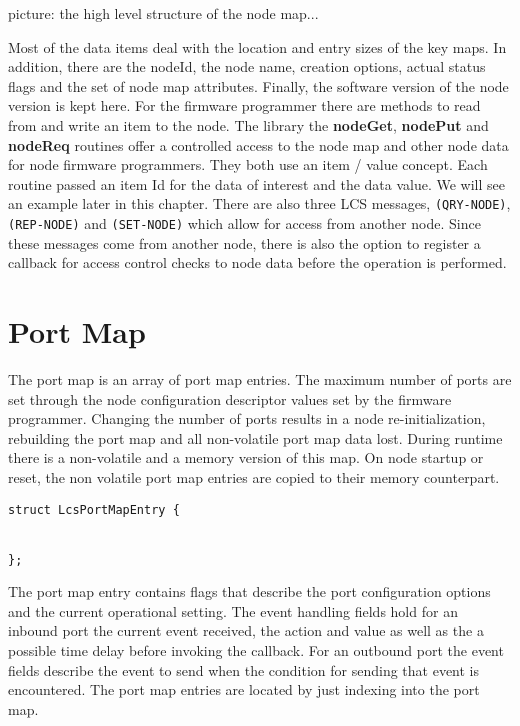 picture: the high level structure of the node map...

\begin{figure}[h]
    \centering
\end{figure}

Most of the data items deal with the location and entry sizes of the key maps. In addition, there are the nodeId, the node name, creation options, actual status flags and the set of node map attributes. Finally, the software version of the node version is kept here. For the firmware programmer there are methods to read from and write an item to the node. The library the \textbf{nodeGet}, \textbf{nodePut} and \textbf{nodeReq} routines offer a controlled access to the node map and other node data for node firmware programmers. They both use an item / value concept. Each routine passed an item Id for the data of interest and the data value. We will see an example later in this chapter. There are also three LCS messages, \texttt{(QRY-NODE)}, \texttt{(REP-NODE)} and \texttt{(SET-NODE)} which allow for access from another node. Since these messages come from another node, there is also the option to register a callback for access control checks to node data before the operation is performed.

\section{Port Map}

The port map is an array of port map entries. The maximum number of ports are set through the node configuration descriptor values set by the firmware programmer. Changing the number of ports results in a node re-initialization, rebuilding the port map and all non-volatile port map data lost. During runtime there is a non-volatile and a memory version of this map. On node startup or reset, the non volatile port map entries are copied to their memory counterpart.

\lstset{language=c++, style=codesnippetstyle}
\begin{lstlisting}
struct LcsPortMapEntry {

  
};
\end{lstlisting}

The port map entry contains flags that describe the port configuration options and the current operational setting. The event handling fields hold for an inbound port the current event received, the action and value as well as the a possible time delay before invoking the callback. For an outbound port the event fields describe the event to send when the condition for sending that event is encountered. The port map entries are located by just indexing into the port map.

